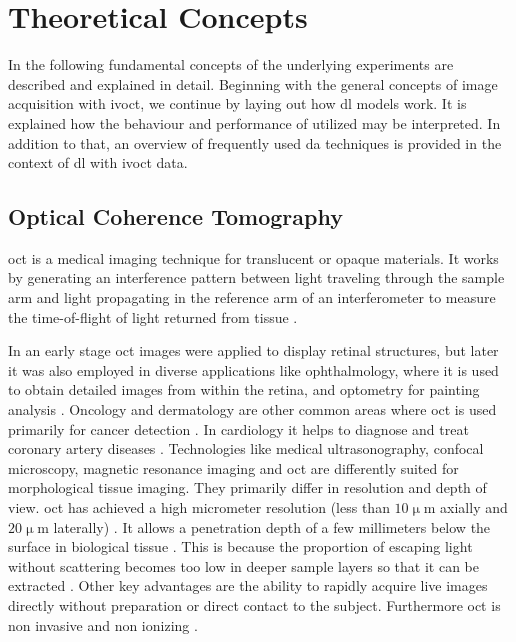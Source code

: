\chapter{Theoretical Concepts}

In the following fundamental concepts of the underlying experiments are described and explained in detail. Beginning with the general concepts of image acquisition with \acrshort{ivoct}, we continue by laying out how \acrshort{dl} models work. It is explained how the behaviour and performance of utilized  may be interpreted. In addition to that, an overview of frequently used \acrshort{da} techniques is provided in the context of \acrshort{dl} with \acrshort{ivoct} data.

\section{Optical Coherence Tomography}

\acrshort{oct} is a medical imaging technique for translucent or opaque materials. It works by generating an interference pattern between light traveling through the sample arm and light propagating in the reference arm of an interferometer to measure the time-of-flight of light returned from tissue \cite{AdamM.Zysk.2007, Drexler.2008}.

In an early stage \acrshort{oct} images were applied to display retinal structures, but later it was also employed in diverse applications like ophthalmology, where it is used to obtain detailed images from within the retina, and optometry for painting analysis \cite{AdamM.Zysk.2007, Drexler.2008}. Oncology and dermatology are other common areas where \acrshort{oct} is used primarily for cancer detection \cite{Welzel.2001, AdamM.Zysk.2007}. In cardiology it helps to diagnose and treat coronary artery diseases \cite{HiramG.Bezerra.2009}. Technologies like medical ultrasonography, confocal microscopy, magnetic resonance imaging and \acrshort{oct} are differently suited for morphological tissue imaging. They primarily differ in resolution and depth of view. \Acrshort{oct} has achieved a high micrometer resolution (less than \( 10 \upmu \)m axially and \( 20 \upmu \)m laterally) \cite{RighabHamdan.2012, GuillermoJ.Tearney.2012, HiramG.Bezerra.2009, KostadinkaBizheva.2017}. It allows a penetration depth of a few millimeters below the surface in biological tissue \cite{AdamM.Zysk.2007, Drexler.2008}. This is because the proportion of escaping light without scattering becomes too low in deeper sample layers so that it can be extracted \cite{Bille.2019, Drexler.2008}. Other key advantages are the ability to rapidly acquire live images directly without preparation or direct contact to the subject. Furthermore \acrshort{oct} is non invasive and non ionizing \cite{Hee.1995}.

